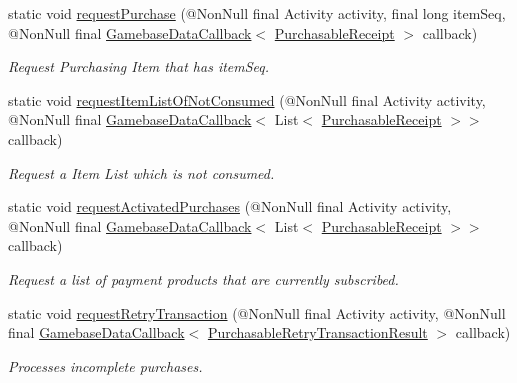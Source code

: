 \begin{DoxyCompactItemize}
static void \hyperlink{classcom_1_1toast_1_1android_1_1gamebase_1_1_gamebase_1_1_purchase_a046768008c4f0d0eb8f6c5052f621b87}{request\+Purchase} (@Non\+Null final Activity activity, final long item\+Seq, @Non\+Null final \hyperlink{interfacecom_1_1toast_1_1android_1_1gamebase_1_1_gamebase_data_callback}{Gamebase\+Data\+Callback}$<$ \hyperlink{classcom_1_1toast_1_1android_1_1gamebase_1_1base_1_1purchase_1_1_purchasable_receipt}{Purchasable\+Receipt} $>$ callback)
\begin{DoxyCompactList}\small\item\em Request Purchasing Item that has item\+Seq. \end{DoxyCompactList}\item 
static void \hyperlink{classcom_1_1toast_1_1android_1_1gamebase_1_1_gamebase_1_1_purchase_a335f00febc88c2052a9914278aebdac0}{request\+Item\+List\+Of\+Not\+Consumed} (@Non\+Null final Activity activity, @Non\+Null final \hyperlink{interfacecom_1_1toast_1_1android_1_1gamebase_1_1_gamebase_data_callback}{Gamebase\+Data\+Callback}$<$ List$<$ \hyperlink{classcom_1_1toast_1_1android_1_1gamebase_1_1base_1_1purchase_1_1_purchasable_receipt}{Purchasable\+Receipt} $>$$>$ callback)
\begin{DoxyCompactList}\small\item\em Request a Item List which is not consumed. \end{DoxyCompactList}\item 
static void \hyperlink{classcom_1_1toast_1_1android_1_1gamebase_1_1_gamebase_1_1_purchase_a865b97145a008db8dcb97682b3cbd8f1}{request\+Activated\+Purchases} (@Non\+Null final Activity activity, @Non\+Null final \hyperlink{interfacecom_1_1toast_1_1android_1_1gamebase_1_1_gamebase_data_callback}{Gamebase\+Data\+Callback}$<$ List$<$ \hyperlink{classcom_1_1toast_1_1android_1_1gamebase_1_1base_1_1purchase_1_1_purchasable_receipt}{Purchasable\+Receipt} $>$$>$ callback)
\begin{DoxyCompactList}\small\item\em Request a list of payment products that are currently subscribed. \end{DoxyCompactList}\item 
static void \hyperlink{classcom_1_1toast_1_1android_1_1gamebase_1_1_gamebase_1_1_purchase_a041c6d7111a2815fe52823a2a56aaec5}{request\+Retry\+Transaction} (@Non\+Null final Activity activity, @Non\+Null final \hyperlink{interfacecom_1_1toast_1_1android_1_1gamebase_1_1_gamebase_data_callback}{Gamebase\+Data\+Callback}$<$ \hyperlink{classcom_1_1toast_1_1android_1_1gamebase_1_1base_1_1purchase_1_1_purchasable_retry_transaction_result}{Purchasable\+Retry\+Transaction\+Result} $>$ callback)
\begin{DoxyCompactList}\small\item\em Processes incomplete purchases. \end{DoxyCompactList}\end{DoxyCompactItemize}


